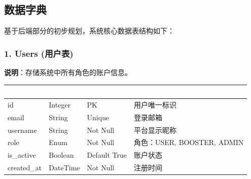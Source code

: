 \documentclass[12pt,a4paper]{article}
\begin{document}
\subsection{数据字典}
基于后端部分的初步规划，系统核心数据表结构如下：

\subsubsection{1. Users (用户表)}
\textbf{说明}：存储系统中所有角色的账户信息。
\begin{table}[H]
\centering
\renewcommand{\arraystretch}{1.3}
\begin{tabularx}{\textwidth}{|l|l|l|X|}
\hline
\rowcolor{headerblue} \textcolor{white}{\textbf{字段名}} & \textcolor{white}{\textbf{数据类型}} & \textcolor{white}{\textbf{约束}} & \textcolor{white}{\textbf{说明}} \\
\hline
id & Integer & PK & 用户唯一标识 \\
\hline
email & String & Unique & 登录邮箱 \\
\hline
username & String & Not Null & 平台显示昵称 \\
\hline
role & Enum & Not Null & 角色：USER, BOOSTER, ADMIN \\
\hline
is\_active & Boolean & Default True & 账户状态 \\
\hline
created\_at & DateTime & Not Null & 注册时间 \\
\hline
\end{tabularx}
\end{table}
\end{document}
